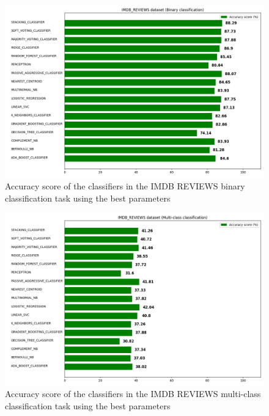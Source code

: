 \documentclass[conference]{IEEEtran}
\begin{document}
\begin{figure}[H]
\centering
\includegraphics[scale = 0.21]{figs/all_classifiers_20newsgroups_and_imdb_using_binary_classification/IMDB_REVIEWS_binary_classification-just_accuracy_score.png}
\caption{Accuracy score of the classifiers in the IMDB REVIEWS binary classification task using the best parameters}
\label{fig:imdb_bin_plot}
\end{figure}

\begin{figure}[H]
\centering
\includegraphics[scale = 0.21]{figs/all_classifiers_just_imdb_using_multi_class_classification/IMDB_REVIEWS_multi_class_classification-just_accuracy_score.png}
\caption{Accuracy score of the classifiers in the IMDB REVIEWS multi-class classification task using the best parameters}
\label{fig:imdb_multi_plot}
\end{figure}
\end{document}
